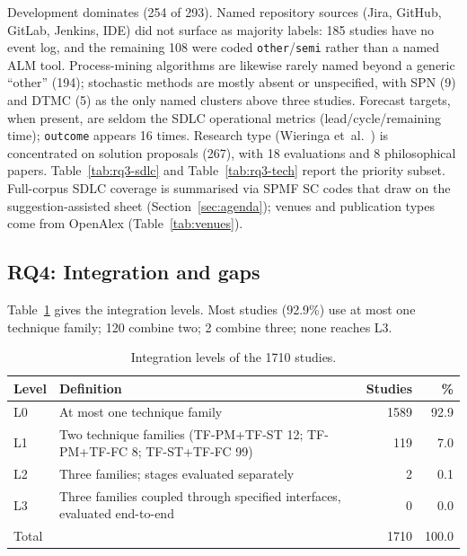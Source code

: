 \documentclass[preprint,12pt,authoryear=false]{elsarticle}
\newcommand{\PM}{TF-PM}
\newcommand{\ST}{TF-ST}
\newcommand{\FC}{TF-FC}
\begin{document}
Development dominates (254 of 293). Named repository sources (Jira, GitHub, GitLab, Jenkins, IDE) did not surface as majority labels: 185 studies have no event log, and the remaining 108 were coded \texttt{other}/\texttt{semi} rather than a named ALM tool. Process-mining algorithms are likewise rarely named beyond a generic ``other'' (194); stochastic methods are mostly absent or unspecified, with SPN (9) and DTMC (5) as the only named clusters above three studies. Forecast targets, when present, are seldom the SDLC operational metrics (lead/cycle/remaining time); \texttt{outcome} appears 16 times. Research type (Wieringa et~al.~\cite{wieringa2006}) is concentrated on solution proposals (267), with 18 evaluations and 8 philosophical papers. Table~\ref{tab:rq3-sdlc} and Table~\ref{tab:rq3-tech} report the priority subset. Full-corpus SDLC coverage is summarised via SPMF SC codes that draw on the suggestion-assisted sheet (Section~\ref{sec:agenda}); venues and publication types come from OpenAlex (Table~\ref{tab:venues}).

\subsection{RQ4: Integration and gaps}\label{sec:rq4}

Table~\ref{tab:levels} gives the integration levels. Most studies (92.9\%) use at most one technique family; 120 combine two; 2 combine three; none reaches L3.

\begin{table}[t]
\centering\small
\caption{Integration levels of the 1710 studies.}\label{tab:levels}
\begin{tabularx}{\textwidth}{lXrr}
\toprule
Level & Definition & Studies & \% \\
\midrule
L0 & At most one technique family & 1589 & 92.9 \\
L1 & Two technique families (\PM{}+\ST{} 12; \PM{}+\FC{} 8; \ST{}+\FC{} 99) & 119 & 7.0 \\
L2 & Three families; stages evaluated separately & 2 & 0.1 \\
L3 & Three families coupled through specified interfaces, evaluated end-to-end & 0 & 0.0 \\
\midrule
Total & & 1710 & 100.0 \\
\bottomrule
\end{tabularx}
\end{table}
\end{document}
